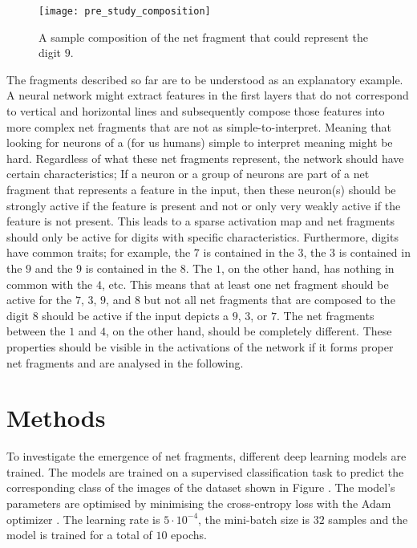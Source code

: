 \begin{figure}[h]
    \centering
    \texttt{[image: pre\_study\_composition]}
    \caption[Sample Net Fragment Composition]{A sample composition of the net fragment that could represent the digit $9$.}
\end{figure}

The fragments described so far are to be understood as an explanatory example.
A neural network might extract features in the first layers that do not correspond to vertical and horizontal lines and subsequently compose those features into more complex net fragments that are not as simple-to-interpret.
Meaning that looking for neurons of a (for us humans) simple to interpret meaning might be hard.
Regardless of what these net fragments represent, the network should have certain characteristics;
If a neuron or a group of neurons are part of a net fragment that represents a feature in the input, then these neuron(s) should be strongly active if the feature is present and not or only very weakly active if the feature is not present.
This leads to a sparse activation map and net fragments should only be active for digits with specific characteristics.
Furthermore, digits have common traits;
for example, the $7$ is contained in the $3$, the $3$ is contained in the $9$ and the $9$ is contained in the $8$.
The $1$, on the other hand, has nothing in common with the $4$, etc.
This means that at least one net fragment should be active for the $7$, $3$, $9$, and $8$ but not all net fragments that are composed to the digit $8$ should be active if the input depicts a $9$, $3$, or $7$.
The net fragments between the $1$ and $4$, on the other hand, should be completely different.
These properties should be visible in the activations of the network if it forms proper net fragments and are analysed in the following.

\section{Methods}
To investigate the emergence of net fragments, different deep learning models are trained.
The models are trained on a supervised classification task to predict the corresponding class of the images of the dataset shown in Figure .
The model's parameters are optimised by minimising the cross-entropy loss with the Adam optimizer .
The learning rate is $5 \cdot 10^{-4}$, the mini-batch size is $32$ samples and the model is trained for a total of $10$ epochs.

